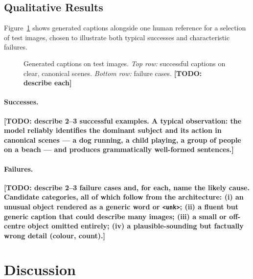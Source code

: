 \documentclass{article}
\begin{document}
\subsection{Qualitative Results}

Figure~\ref{fig:qualitative} shows generated captions alongside one human
reference for a selection of test images, chosen to illustrate both typical
successes and characteristic failures.

\begin{figure}[h]
  \centering
  \caption{Generated captions on test images. \emph{Top row:} successful
           captions on clear, canonical scenes. \emph{Bottom row:} failure
           cases. \textbf{[TODO: describe each]}}
  \label{fig:qualitative}
\end{figure}

\paragraph{Successes.}
\textbf{[TODO: describe 2--3 successful examples. A typical observation: the
model reliably identifies the dominant subject and its action in canonical
scenes --- a dog running, a child playing, a group of people on a beach --- and
produces grammatically well-formed sentences.]}

\paragraph{Failures.}
\textbf{[TODO: describe 2--3 failure cases and, for each, name the likely cause.
Candidate categories, all of which follow from the architecture:
(i) an unusual object rendered as a generic word or \texttt{<unk>};
(ii) a fluent but generic caption that could describe many images;
(iii) a small or off-centre object omitted entirely;
(iv) a plausible-sounding but factually wrong detail (colour, count).]}

\section{Discussion}
\end{document}
